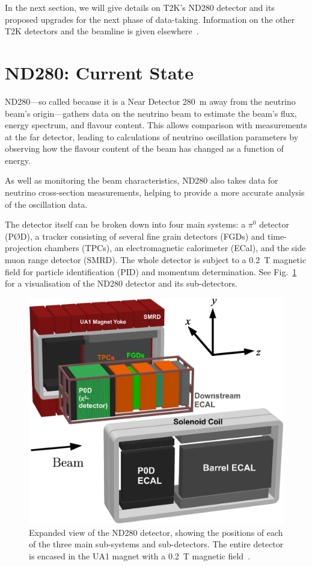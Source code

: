\documentclass[aps,pra,12pt,notitlepage,tightenlines]{revtex4-1}
\begin{document}
In the next section, we will give details on T2K's ND280 detector and its proposed upgrades for the next phase of data-taking. Information on the other T2K detectors and the beamline is given elsewhere~\cite{ABE2011106}.

\section{ND280: Current State}
ND280---so called because it is a Near Detector 280~m away from the neutrino beam's origin---gathers data on the neutrino beam to estimate the beam's flux, energy spectrum, and flavour content. This allows comparison with measurements at the far detector, leading to calculations of neutrino oscillation parameters by observing how the flavour content of the beam has changed as a function of energy. 

As well as monitoring the beam characteristics, ND280 also takes data for neutrino cross-section measurements, helping to provide a more accurate analysis of the oscillation data. 

The detector itself can be broken down into four main systems: a $\pi^0$ detector (P\O D), a tracker consisting of several fine grain detectors (FGDs) and time-projection chambers (TPCs), an electromagnetic calorimeter (ECal), and the side muon range detector (SMRD). The whole detector is subject to a 0.2~T magnetic field for particle identification (PID) and momentum determination. See Fig.\ \ref{fig:ND} for a visualisation of the ND280 detector and its sub-detectors.
\begin{figure}
 \includegraphics[scale=1]{ND280.png}
 \caption{Expanded view of the ND280 detector, showing the positions of each of the three main sub-systems and sub-detectors. The entire detector is encased in the UA1 magnet with a 0.2~T magnetic field~\cite{ABE2011106}.}
 \label{fig:ND}
\end{figure}
\end{document}
